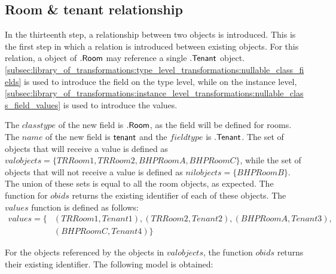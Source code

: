 \subsection{Room \& tenant relationship}
\label{sec:application:building_the_model:room_tenant_relationship}

In the thirteenth step, a relationship between two objects is introduced. This is the first step in which a relation is introduced between existing objects. For this relation, a object of $.\mathsf{Room}$ may reference a single $.\mathsf{Tenant}$ object. \cref{subsec:library_of_transformations:type_level_transformations:nullable_class_fields} is used to introduce the field on the type level, while on the instance level, \cref{subsec:library_of_transformations:instance_level_transformations:nullable_class_field_values} is used to introduce the values.

The $classtype$ of the new field is $.\mathsf{Room}$, as the field will be defined for rooms. The $name$ of the new field is $\mathsf{tenant}$ and the $fieldtype$ is $.\mathsf{Tenant}$. The set of objects that will receive a value is defined as $valobjects = \{TRRoom1, TRRoom2, BHPRoomA, BHPRoomC\}$, while the set of objects that will not receive a value is defined as $nilobjects = \{BHPRoomB\}$. The union of these sets is equal to all the room objects, as expected. The function for $obids$ returns the existing identifier of each of these objects. The $values$ function is defined as follows:
\begin{align*}
    values = \{&(TRRoom1, Tenant1), (TRRoom2, Tenant2), (BHPRoomA, Tenant3), \\&(BHPRoomC, Tenant4)\}
\end{align*}

For the objects referenced by the objects in $valobjects$, the function $obids$ returns their existing identifier. The following model is obtained:


